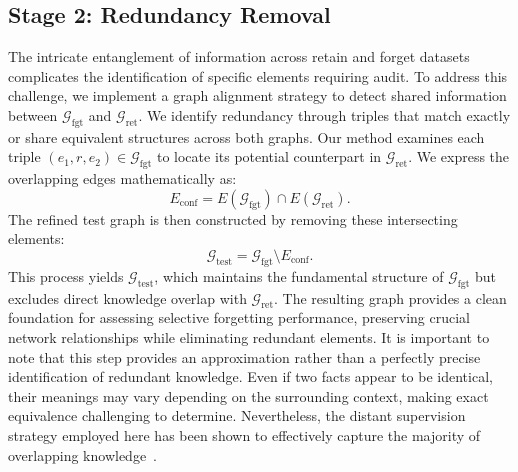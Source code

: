 \subsection{Stage 2: Redundancy Removal}

The intricate entanglement of information across retain and forget datasets complicates the identification of specific elements requiring audit.
To address this challenge, we implement a graph alignment strategy to detect shared information between  \(\mathcal{G}_{\text{fgt}}\) and \(\mathcal{G}_{\text{ret}}\). We identify redundancy through triples that match exactly or share equivalent structures across both graphs. Our method examines each triple \((e_1, r, e_2) \in \mathcal{G}_{\text{fgt}}\) to locate its potential counterpart in \(\mathcal{G}_{\text{ret}}\). We express the overlapping edges mathematically as:
\begin{equation}
E_{\text{conf}} = E(\mathcal{G}_{\text{fgt}}) \cap E(\mathcal{G}_{\text{ret}}).
\end{equation}
The refined test graph is then constructed by removing these intersecting elements:
\begin{equation}
\mathcal{G}_{\text{test}} = \mathcal{G}_{\text{fgt}} \setminus E_{\text{conf}}.
\end{equation}
This process yields \(\mathcal{G}_{\text{test}}\), which maintains the fundamental structure of \(\mathcal{G}_{\text{fgt}}\) but excludes direct knowledge overlap with \(\mathcal{G}_{\text{ret}}\). The resulting graph provides a clean foundation for assessing selective forgetting performance, preserving crucial network relationships while eliminating redundant elements.
It is important to note that this step provides an approximation rather than a perfectly precise identification of redundant knowledge. Even if two facts appear to be identical, their meanings may vary depending on the surrounding context, making exact equivalence challenging to determine. Nevertheless, the distant supervision strategy employed here has been shown to effectively capture the majority of overlapping knowledge~\cite{mintz2009distant}. 


